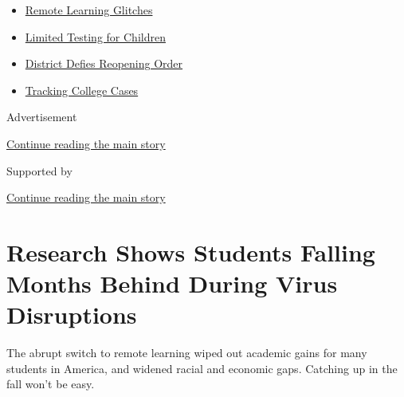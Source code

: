 \begin{itemize}
\tightlist
\item
  \href{https://www.nytimes3xbfgragh.onion/2020/09/08/us/school-districts-cyberattacks-glitches.html?name=styln-coronavirus-schools-reopening\&region=TOP_BANNER\&block=storyline_menu_recirc\&action=click\&pgtype=Article\&impression_id=72c01051-f52b-11ea-8e93-c18eceeec4bb\&variant=undefined}{Remote
  Learning Glitches}
\item
  \href{https://www.nytimes3xbfgragh.onion/2020/09/08/upshot/children-testing-shortfalls-virus.html?name=styln-coronavirus-schools-reopening\&region=TOP_BANNER\&block=storyline_menu_recirc\&action=click\&pgtype=Article\&impression_id=72c01052-f52b-11ea-8e93-c18eceeec4bb\&variant=undefined}{Limited
  Testing for Children}
\item
  \href{https://www.nytimes3xbfgragh.onion/2020/09/10/us/des-moines-school-opening-coronavirus.html?name=styln-coronavirus-schools-reopening\&region=TOP_BANNER\&block=storyline_menu_recirc\&action=click\&pgtype=Article\&impression_id=72c01053-f52b-11ea-8e93-c18eceeec4bb\&variant=undefined}{District
  Defies Reopening Order}
\item
  \href{https://www.nytimes3xbfgragh.onion/interactive/2020/us/covid-college-cases-tracker.html?name=styln-coronavirus-schools-reopening\&region=TOP_BANNER\&block=storyline_menu_recirc\&action=click\&pgtype=Article\&impression_id=72c03760-f52b-11ea-8e93-c18eceeec4bb\&variant=undefined}{Tracking
  College Cases}
\end{itemize}

Advertisement

\protect\hyperlink{after-top}{Continue reading the main story}

Supported by

\protect\hyperlink{after-sponsor}{Continue reading the main story}

\hypertarget{research-shows-students-falling-months-behind-during-virus-disruptions}{%
\section{Research Shows Students Falling Months Behind During Virus
Disruptions}\label{research-shows-students-falling-months-behind-during-virus-disruptions}}

The abrupt switch to remote learning wiped out academic gains for many
students in America, and widened racial and economic gaps. Catching up
in the fall won't be easy.

